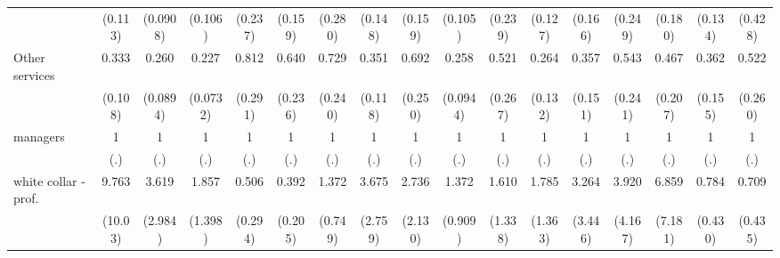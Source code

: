 {\begin{tabular}{l*{16}{c}}
                    &     (0.113)         &    (0.0908)         &     (0.106)         &     (0.237)         &     (0.159)         &     (0.280)         &     (0.148)         &     (0.159)         &     (0.105)         &     (0.239)         &     (0.127)         &     (0.166)         &     (0.249)         &     (0.180)         &     (0.134)         &     (0.428)         \\
[1em]
Other services      &       0.333\sym{***}&       0.260\sym{***}&       0.227\sym{***}&       0.812         &       0.640         &       0.729         &       0.351\sym{**} &       0.692         &       0.258\sym{***}&       0.521         &       0.264\sym{**} &       0.357\sym{*}  &       0.543         &       0.467         &       0.362\sym{*}  &       0.522         \\
                    &     (0.108)         &    (0.0894)         &    (0.0732)         &     (0.291)         &     (0.236)         &     (0.240)         &     (0.118)         &     (0.250)         &    (0.0944)         &     (0.267)         &     (0.132)         &     (0.151)         &     (0.241)         &     (0.207)         &     (0.155)         &     (0.260)         \\
[1em]
managers            &           1         &           1         &           1         &           1         &           1         &           1         &           1         &           1         &           1         &           1         &           1         &           1         &           1         &           1         &           1         &           1         \\
                    &         (.)         &         (.)         &         (.)         &         (.)         &         (.)         &         (.)         &         (.)         &         (.)         &         (.)         &         (.)         &         (.)         &         (.)         &         (.)         &         (.)         &         (.)         &         (.)         \\
[1em]
white collar - prof.&       9.763\sym{*}  &       3.619         &       1.857         &       0.506         &       0.392         &       1.372         &       3.675         &       2.736         &       1.372         &       1.610         &       1.785         &       3.264         &       3.920         &       6.859         &       0.784         &       0.709         \\
                    &     (10.03)         &     (2.984)         &     (1.398)         &     (0.294)         &     (0.205)         &     (0.749)         &     (2.759)         &     (2.130)         &     (0.909)         &     (1.338)         &     (1.363)         &     (3.446)         &     (4.167)         &     (7.181)         &     (0.430)         &     (0.435)         \\

\end{tabular}}
